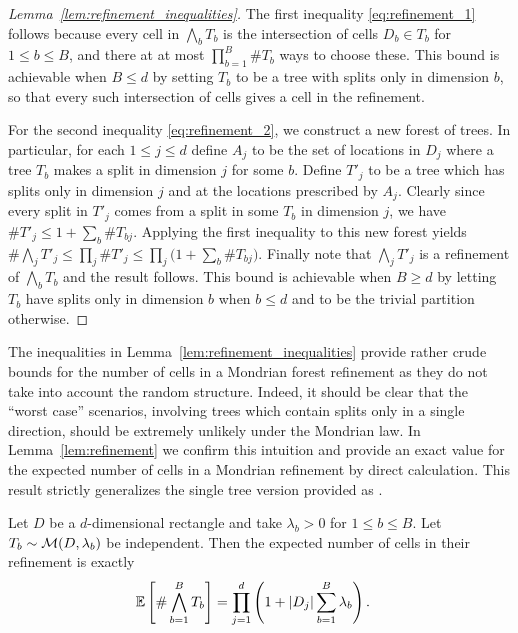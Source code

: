 \begin{proof}[Lemma~\ref{lem:refinement_inequalities}]

  The first inequality \eqref{eq:refinement_1}
  follows because every cell in
  $\bigwedge_b T_b$ is the intersection of cells
  $D_b \in T_b$ for $1 \leq b \leq B$, and there at at most
  $\prod_{b=1}^{B} \# T_b$ ways to choose these.
  This bound is achievable when $B \leq d$ by setting
  $T_b$ to be a tree with splits only in dimension $b$,
  so that every such intersection of cells
  gives a cell in the refinement.

  For the second inequality \eqref{eq:refinement_2},
  we construct a new forest of trees.
  In particular, for each $1 \leq j \leq d$ define
  $A_j$ to be the set of locations in $D_j$ where a tree $T_b$
  makes a split in dimension $j$ for some $b$.
  Define $T'_j$ to be a tree which has splits
  only in dimension $j$ and at the locations prescribed by $A_j$.
  Clearly since every split in $T'_j$
  comes from a split in some $T_b$ in dimension $j$,
  we have $\# T'_j \leq 1 + \sum_b \# T_{b j}$.
  Applying the first inequality to this new forest yields
  $\# \bigwedge_j T'_j \leq \prod_j \# T'_j
  \leq \prod_j \big( 1 + \sum_b \# T_{b j} \big)$.
  Finally note that $\bigwedge_j T'_j$
  is a refinement of $\bigwedge_b T_b$ and the result follows.
  This bound is achievable when $B \geq d$ by letting
  $T_b$ have splits only in dimension $b$ when $b \leq d$
  and to be the trivial partition otherwise.
\end{proof}

The inequalities in Lemma~\ref{lem:refinement_inequalities} provide
rather crude bounds for the number of cells in a Mondrian forest
refinement as they do not take into account the random structure.
Indeed, it should be clear that the ``worst case'' scenarios, involving
trees which contain splits only in a single direction, should be extremely
unlikely under the Mondrian law. In Lemma~\ref{lem:refinement} we confirm
this intuition and provide an exact value for the expected number of cells
in a Mondrian refinement by direct calculation. This result strictly generalizes
the single tree version provided as \citet[Proposition~2]{mourtada2020minimax}.

\begin{lemma}
  \label{lem:refinement}

  Let $D$ be a $d$-dimensional rectangle
  and take $\lambda_b > 0$ for $1 \leq b \leq B$.
  Let $T_b \sim \mathcal{M}(D, \lambda_b)$ be independent.
  Then the expected number of cells in their refinement is exactly
  \begin{align*}
    \mathbb{E}\left[\# \bigwedge_{b=1}^B T_b \right]
    &= \prod_{j=1}^d \left(
      1 + |D_j| \sum_{b=1}^B \lambda_b
    \right).
  \end{align*}
\end{lemma}

